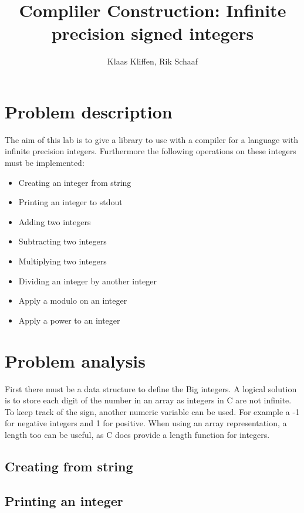 \documentclass[a4paper,11pt]{article}
\title{Compliler Construction: Infinite precision signed integers }
\author{Klaas Kliffen, Rik Schaaf}
\date{}
\begin{document}

\maketitle


\section{Problem description}
The aim of this lab is to give a library to use with a compiler for a language with infinite precision integers.
Furthermore the following operations on these integers must be implemented:
\begin{itemize}
 \item Creating an integer from string
 \item Printing an integer to stdout
 \item Adding two integers
 \item Subtracting two integers
 \item Multiplying two integers
 \item Dividing an integer by another integer
 \item Apply a modulo on an integer
 \item Apply a power to an integer
\end{itemize}

\section{Problem analysis}
First there must be a data structure to define the Big integers.
A logical solution is to store each digit of the number in an array as integers in C are not infinite.
To keep track of the sign, another numeric variable can be used.
For example a -1 for negative integers and 1 for positive.
When using an array representation, a length too can be useful, as C does provide a length function for integers.
\subsection{Creating from string}

\subsection{Printing an integer}
\end{document}
